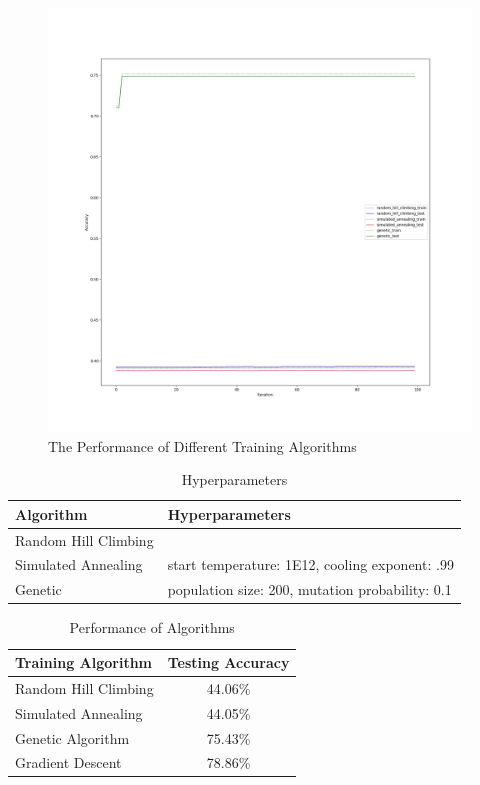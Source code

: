 \documentclass[11pt]{article}
\begin{document}
\begin{figure}[h!]
  \includegraphics[width=\linewidth]{../plot/nn_plot.jpg}
  \caption{The Performance of Different Training Algorithms}
  \label{fig:nn}
\end{figure}

\begin{table}[h!]
  \begin{center}
    \caption{Hyperparameters}
    \label{tab:hy_nn}
    \begin{tabular}{l|l}
      \textbf{Algorithm} & \textbf{Hyperparameters}\\
      \hline
      Random Hill Climbing & \\
      Simulated Annealing &  start temperature: 1E12, cooling exponent: .99\\
      Genetic & population size: 200, mutation probability: 0.1\\
    \end{tabular}
  \end{center}
\end{table}

\begin{table}[h!]
  \begin{center}
    \caption{Performance of Algorithms}
    \label{tab:adult}
    \begin{tabular}{l|c}
      \textbf{Training Algorithm} & \textbf{Testing Accuracy}\\
      \hline
      Random Hill Climbing & 44.06\%\\
      Simulated Annealing & 44.05\%\\
      Genetic Algorithm & 75.43\%\\
      Gradient Descent & 78.86\%\\
    \end{tabular}
  \end{center}
\end{table}
\end{document}
